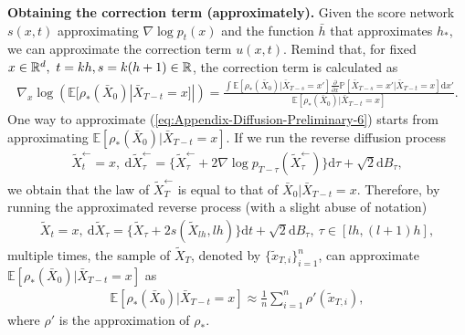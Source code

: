 {\bf Obtaining the correction term (approximately).} 
\label{sec:AppendixCorrectionTermBound}
Given the score network $s(x,t)$ approximating $\nabla \log p_t(x)$ and the function $\bar{h}$ that approximates $h_*$, we can approximate the correction term $u(x,t)$.
Remind that, for fixed $x\in \mathbb{R}^d,\ t=kh, s=k(h+1)\in \mathbb{R}$, the correction term is calculated as
\begin{align}
    \nabla_x \log (\mathbb{E}[\rho_*(\bar{X}_0)|\bar{X}_{T-t}=x]|)
    = 
    \frac{
        \int
        \mathbb{E}[\rho_*(\bar{X}_0)|\bar{X}_{T-s}=x']
        \frac{\partial}{\partial x}\mathbb{P}[\bar{X}_{T-s}=x'|\bar{X}_{T-t}=x]\mathrm{d}x'
    }{
        \mathbb{E}[\rho_*(\bar{X}_0)|\bar{X}_{T-t}=x]
    }.
    \label{eq:Appendix-Diffusion-Preliminary-6}
\end{align}
One way to approximate (\ref{eq:Appendix-Diffusion-Preliminary-6}) starts from approximating $\mathbb{E}[\rho_*(\bar{X}_0)|\bar{X}_{T-t}=x]$. 
If we run the reverse diffusion process
\begin{align}
    \tilde{X}_{t}^\leftarrow=x,\ \mathrm{d}\tilde{X}_{\tau}^\leftarrow = \{\tilde{X}_{\tau}^\leftarrow + 2\nabla \log p_{T-\tau}(\tilde{X}_{\tau}^\leftarrow)\}\mathrm{d}\tau + \sqrt{2}\mathrm{d}B_\tau,
\end{align}
we obtain that the law of $\tilde{X}_{T}^\leftarrow$ is equal to that of $\bar{X}_0|\bar{X}_{T-t}=x$. 
Therefore, by running the approximated reverse process (with a slight abuse of notation)
\begin{align}
    \tilde{X}_{t} = x,\ 
    \mathrm{d}\tilde{X}_{\tau} = \{\tilde{X}_\tau + 2s(\tilde{X}_{lh},lh)\}\mathrm{d}t + \sqrt{2}\mathrm{d}B_\tau,\ \tau\in [lh,(l+1)h],
    \label{eq:Appendix-Diffusion-Preliminary-9}
\end{align}
multiple times, the sample of $\tilde{X}_T$, denoted by $\{\tilde{x}_{T,i}\}_{i=1}^n$, can approximate $\mathbb{E}[\rho_*(\bar{X}_0)|\bar{X}_{T-t}=x]$ as
\begin{align}
    \mathbb{E}[\rho_*(\bar{X}_0)|\bar{X}_{T-t}=x] \approx
    \frac1n\sum_{i=1}^n \rho'(\tilde{x}_{T,i}),
      \label{eq:Appendix-Diffusion-Preliminary-8}
\end{align}
where $\rho'$ is the approximation of $\rho_*$. 


